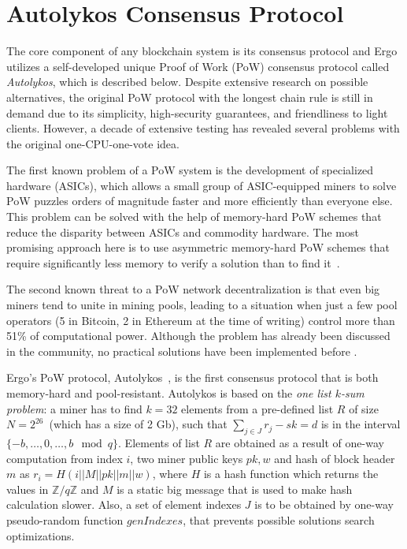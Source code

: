 \section{Autolykos Consensus Protocol}
\label{sec:autolykos}

The core component of any blockchain system is its consensus protocol and Ergo utilizes a self-developed
unique Proof of Work (PoW) consensus protocol called {\em Autolykos}, which is described below.
Despite extensive research on possible alternatives, the original PoW protocol with the longest chain rule is still in demand due to its simplicity, high-security guarantees, and friendliness to light clients.
However, a decade of extensive testing has revealed several problems with the original one-CPU-one-vote idea.

The first known problem of a PoW system is the development of specialized hardware (ASICs), which allows a small group of ASIC-equipped miners to solve PoW puzzles orders of magnitude faster and more efficiently than everyone else. This problem can be solved with the help of memory-hard PoW schemes that reduce the disparity between ASICs and commodity hardware. The most promising approach here is to use asymmetric memory-hard PoW schemes that require significantly less memory to verify a solution than to find it~\cite{biryukov2017equihash,ethHash}.

The second known threat to a PoW network decentralization is that even big miners tend to unite in
mining pools, leading to a situation when just a few pool operators (5 in Bitcoin, 2 in Ethereum
at the time of writing) control more than 51\% of computational power.
Although the problem has already been discussed in the community, no practical solutions have been
implemented before \Ergo{}.


Ergo's PoW protocol, Autolykos~\cite{Ergopow}, is the first consensus protocol that is both memory-hard
and pool-resistant.
Autolykos is based on the {\em one list $k$-sum problem}: a miner has to find
$k=32$ elements from a pre-defined list $R$ of size $N=2^{26}$~(which has a size of 2 Gb),
such that $\sum_{j \in J} r_{j} - sk = d$ is in the interval $\{-b,\dots,0,\dots,b\mod q\}$.
Elements of list $R$ are obtained as a result of one-way computation from index $i$,
two miner public keys $pk,w$ and hash of block header $m$ as $r_i=H(i||M||pk||m||w)$,
where $H$ is a hash function which returns the values in $\mathbb{Z}/q\mathbb{Z}$ and
$M$ is a static big message that is used to make hash calculation slower.
Also, a set of element indexes $J$ is to be obtained
by one-way pseudo-random function $genIndexes$, that prevents possible solutions
search optimizations.

